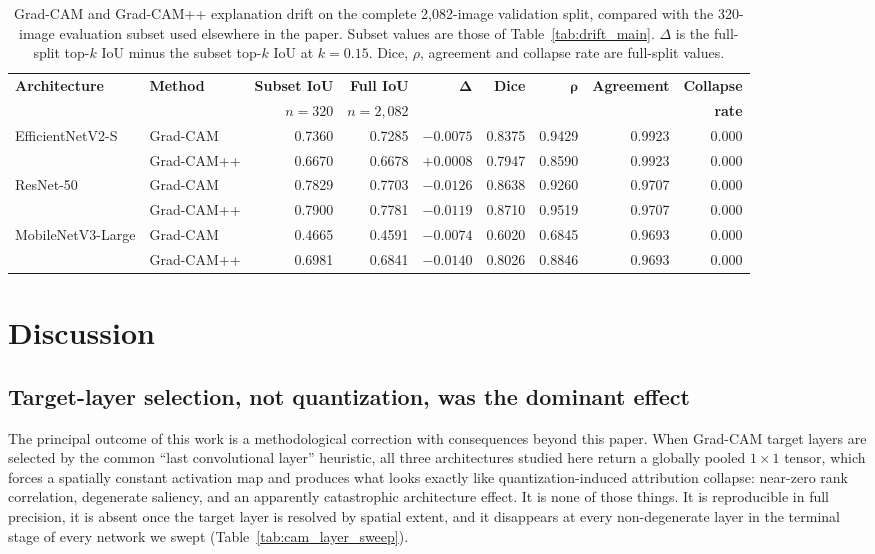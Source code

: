 \documentclass[fleqn,10pt]{wlscirep}
\begin{document}
\begin{table}[htbp]
\centering
\small
\caption{Grad-CAM and Grad-CAM++ explanation drift on the complete 2{,}082-image validation split, compared with the 320-image evaluation subset used elsewhere in the paper. Subset values are those of Table~\ref{tab:drift_main}. $\Delta$ is the full-split top-$k$ IoU minus the subset top-$k$ IoU at $k = 0.15$. Dice, $\rho$, agreement and collapse rate are full-split values.}
\label{tab:fullsplit_cam}
\begin{tabular}{llrrrrrrr}
\toprule
\textbf{Architecture} & \textbf{Method} & \textbf{Subset IoU} & \textbf{Full IoU} & $\boldsymbol{\Delta}$ & \textbf{Dice} & $\boldsymbol{\rho}$ & \textbf{Agreement} & \textbf{Collapse} \\
 & & $n{=}320$ & $n{=}2{,}082$ & & & & & \textbf{rate} \\
\midrule
\multirow{2}{*}{EfficientNetV2-S} & Grad-CAM & 0.7360 & 0.7285 & $-0.0075$ & 0.8375 & 0.9429 & 0.9923 & 0.000 \\
 & Grad-CAM++ & 0.6670 & 0.6678 & $+0.0008$ & 0.7947 & 0.8590 & 0.9923 & 0.000 \\
\midrule
\multirow{2}{*}{ResNet-50} & Grad-CAM & 0.7829 & 0.7703 & $-0.0126$ & 0.8638 & 0.9260 & 0.9707 & 0.000 \\
 & Grad-CAM++ & 0.7900 & 0.7781 & $-0.0119$ & 0.8710 & 0.9519 & 0.9707 & 0.000 \\
\midrule
\multirow{2}{*}{MobileNetV3-Large} & Grad-CAM & 0.4665 & 0.4591 & $-0.0074$ & 0.6020 & 0.6845 & 0.9693 & 0.000 \\
 & Grad-CAM++ & 0.6981 & 0.6841 & $-0.0140$ & 0.8026 & 0.8846 & 0.9693 & 0.000 \\
\bottomrule
\end{tabular}
\end{table}


\section*{Discussion}

\subsection*{Target-layer selection, not quantization, was the dominant effect}

The principal outcome of this work is a methodological correction with consequences beyond this paper. When Grad-CAM target layers are selected by the common ``last convolutional layer'' heuristic, all three architectures studied here return a globally pooled $1 \times 1$ tensor, which forces a spatially constant activation map and produces what looks exactly like quantization-induced attribution collapse: near-zero rank correlation, degenerate saliency, and an apparently catastrophic architecture effect. It is none of those things. It is reproducible in full precision, it is absent once the target layer is resolved by spatial extent, and it disappears at every non-degenerate layer in the terminal stage of every network we swept (Table~\ref{tab:cam_layer_sweep}).
\end{document}
